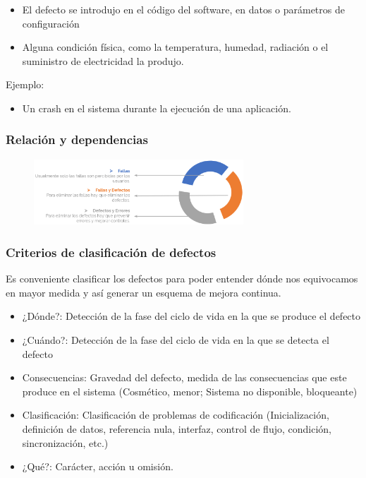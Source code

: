     \begin{itemize}
        \item El defecto se introdujo en el código del software, en datos o parámetros de configuración
        \item Alguna condición física, como la temperatura, humedad, radiación o el suministro de electricidad la produjo.
    \end{itemize}
    
    Ejemplo:
    
    \begin{itemize}
        \item Un crash en el sistema durante la ejecución de una aplicación.
    \end{itemize}
    
    \subsubsection*{Relación y dependencias}

    \begin{figure}[h]
        \centering
        \includegraphics[width=0.7\textwidth]{imgs/3.png}
    \end{figure}
    
    \subsubsection*{Criterios de clasificación de defectos}

    
    Es conveniente clasificar los defectos para poder entender dónde nos equivocamos en mayor medida y así generar un esquema de mejora continua.
    
    \begin{itemize}
        \item ¿Dónde?: Detección de la fase del ciclo de vida en la que se produce el defecto
        \item ¿Cuándo?: Detección de la fase del ciclo de vida en la que se detecta el defecto
        \item Consecuencias: Gravedad del defecto, medida de las consecuencias que este produce en el sistema (Cosmético, menor; Sistema no disponible, bloqueante)
        \item Clasificación: Clasificación de problemas de codificación (Inicialización, definición de datos, referencia nula, interfaz, control de flujo, condición, sincronización, etc.)
        \item ¿Qué?: Carácter, acción u omisión.
    \end{itemize}
    
